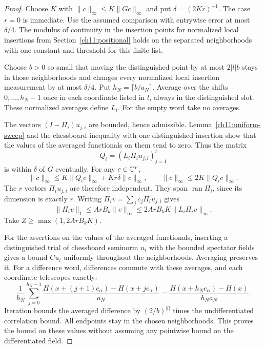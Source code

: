 \begin{proof}
Choose $K$ with $\|c\|_\infty\le K\|Gc\|_\infty$ and put
$\delta=(2Kr)^{-1}$. The case $r=0$ is immediate.
Use the assumed comparison with entrywise error at most $\delta/4$.
The modulus of continuity in the insertion points for normalized local insertions from
Section~\ref{ch11:positional} holds on the separated neighborhoods
with one constant and threshold for this finite list.

Choose $b>0$ so small that moving the distinguished point by at most
$2|l|b$ stays in those neighborhoods and changes every normalized local insertion
measurement by at most $\delta/4$. Put $h_N=\lceil b/a_N\rceil$.
Average over the shifts $0,\ldots,h_N-1$ once in each coordinate
listed in $l$, always in the distinguished slot. These normalized
averages define $L_i$. For the empty word take no averages.

The vectors $(I-\Pi_i)u_{j,i}$ are bounded, hence admissible.
Lemma~\ref{ch11:uniform-sweep} and the chessboard inequality with one distinguished insertion
show that the values of the averaged functionals on them tend to zero.
Thus the matrix
\[
 Q_i=(L_i\Pi_i u_{j,i})_{j=1}^r
\]
is within $\delta$ of $G$ eventually. For any $c\in\mathbb C^r$,
\[
 \|c\|_\infty
 \le K\|Q_ic\|_\infty+Kr\delta\|c\|_\infty,
 \qquad
 \|c\|_\infty\le2K\|Q_ic\|_\infty.
\]
The $r$ vectors $\Pi_i u_{j,i}$ are therefore independent.
They span $\operatorname{ran}\Pi_i$, since its dimension is
exactly $r$. Writing $\Pi_i v=\sum_jc_j\Pi_i u_{j,i}$ gives
\[
 \|\Pi_i v\|_1\le ArB_k\|c\|_\infty
       \le2ArB_kK\|L_i\Pi_i v\|_\infty.
\]
Take $Z\ge\max(1,2ArB_kK)$.

For the assertions on the values of the averaged functionals, inserting a distinguished trial of chessboard seminorm $u_i$ with the bounded spectator fields gives a bound $Cu_i$
uniformly throughout the neighborhoods. Averaging preserves it.
For a difference word, differences commute with these averages,
and each coordinate telescopes exactly:
\[
 \frac1{h_N}\sum_{j=0}^{h_N-1}
 \frac{H(x+(j+1)e_\alpha)-H(x+je_\alpha)}{a_N}
 =\frac{H(x+h_Ne_\alpha)-H(x)}{h_Na_N}.
\]
Iteration bounds the averaged difference by
$(2/b)^{|l|}$ times the undifferentiated correlation bound.
All endpoints stay in the chosen neighborhoods.
This proves the bound on these values without assuming any pointwise
bound on the differentiated field.
\end{proof}

